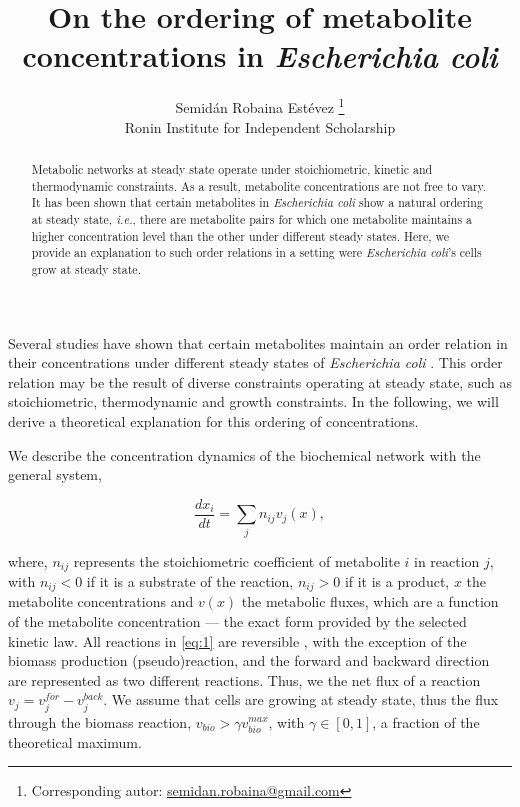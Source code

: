 \documentclass[12pt]{article}
\title{On the ordering of metabolite concentrations in \emph{Escherichia coli}}
\author{Semid\'an Robaina Est\'evez \footnote{Corresponding autor: \href{mailto:semidan.robaina@gmail.com}{semidan.robaina@gmail.com}}\\Ronin Institute for Independent Scholarship}
\date{\vspace{-5ex}}
\newcommand{\note}[2][]{\added[#1,remark={#2}]{}}
\begin{document}
  \maketitle
  

  \begin{abstract}
    Metabolic networks at steady state operate under stoichiometric, kinetic and thermodynamic constraints. As a result, metabolite concentrations are not free to vary. It has been shown that certain metabolites in \emph{Escherichia coli} show a natural ordering at steady state, \emph{i.e.}, there are metabolite pairs for which one metabolite maintains a higher concentration level than the other under different steady states. Here, we provide an explanation to such order relations in a setting were \emph{Escherichia coli}'s cells grow at steady state.
  \end{abstract}


  Several studies have shown that certain metabolites maintain an order relation in their concentrations under different steady states of \emph{Escherichia coli} \cite{Bennett2008,Bennett2009a}. This order relation may be the result of diverse constraints operating at steady state, such as stoichiometric, thermodynamic and growth constraints. In the following, we will derive a theoretical explanation for this ordering of concentrations.

  We describe the concentration dynamics of the biochemical network with the general system,

  \begin{equation}
    \label{eq:1}
    \frac{dx_i}{dt} = \sum_j n_{ij} v_j(x),
  \end{equation}

  \noindent where, $n_{ij}$ represents the stoichiometric coefficient of metabolite $i$ in reaction $j$, with $n_{ij} < 0$ if it is a substrate of the reaction, $n_{ij} > 0$ if it is a product, $x$ the metabolite concentrations and $v(x)$ the metabolic fluxes, which are a function of the metabolite concentration --- the exact form provided by the selected kinetic law. All reactions in \ref{eq:1} are reversible \note[id=SRE]{Might as well include pre-defined irreversible reactions}, with the exception of the biomass production (pseudo)reaction, and the forward and backward direction are represented as two different reactions. Thus, we the net flux of a reaction $v_j = v_j^{for} - v_j^{back}$. We assume that cells are growing at steady state, thus the flux through the biomass reaction, $v_{bio} > \gamma v^{max}_{bio}$, with $\gamma \in [0, 1]$, a fraction of the theoretical maximum. \note[id=SRE]{I'll make a proper intro after I get results. Starting with the second law more appropriate}
\end{document}
